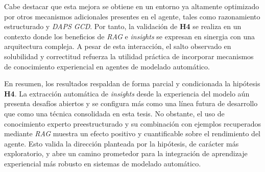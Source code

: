 Cabe destacar que esta mejora se obtiene en un entorno ya altamente optimizado por otros mecanismos adicionales presentes en el agente, tales como razonamiento estructurado y \textit{DAPS GCD}. Por tanto, la validación de \textbf{H4} se realiza en un contexto donde los beneficios de \textit{RAG} e \textit{insights} se expresan en sinergia con una arquitectura compleja. A pesar de esta interacción, el salto observado en solubilidad y correctitud refuerza la utilidad práctica de incorporar mecanismos de conocimiento experiencial en agentes de modelado automático.

En resumen, los resultados respaldan de forma parcial y condicionada la hipótesis \textbf{H4}. La extracción automática de \textit{insights} desde la experiencia del modelo aún presenta desafíos abiertos y se configura más como una línea futura de desarrollo que como una técnica consolidada en esta tesis. No obstante, el uso de conocimiento experto preestructurado y su combinación con ejemplos recuperados mediante \textit{RAG} muestra un efecto positivo y cuantificable sobre el rendimiento del agente. Esto valida la dirección planteada por la hipótesis, de carácter más exploratorio, y abre un camino prometedor para la integración de aprendizaje experiencial más robusto en sistemas de modelado automático.
